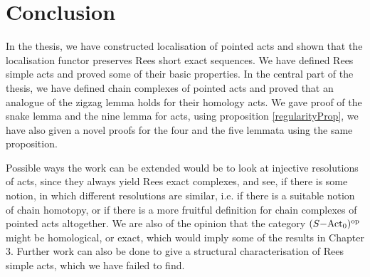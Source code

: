 \chapter*{Conclusion}

    In the thesis, we have constructed localisation of pointed acts and shown that the localisation functor preserves Rees short exact sequences. We 
have defined Rees simple acts and proved some of their basic properties. In the central part of the thesis, we have defined chain complexes of pointed acts and 
proved that an analogue of the zigzag lemma holds for their homology acts. We gave proof of the snake lemma and the nine lemma for acts, using proposition \ref{regularityProp}, we have 
also given a novel proofs for the four and the five lemmata using the same proposition. \par 
    Possible ways the work can be extended would be to look at injective resolutions of acts, since they always yield Rees exact complexes, and see, if there is some notion, in which 
different resolutions are similar, i.e. if there is a suitable notion of chain homotopy, or if there is a more fruitful definition for chain complexes of pointed acts altogether. We are also of the 
opinion that the category $(S\mathrm{-Act}_0)^{\mathrm{op}}$ might be homological, or exact, which would imply some of the results in Chapter 3. Further work can also be done to give a structural characterisation 
of Rees simple acts, which we have failed to find. 